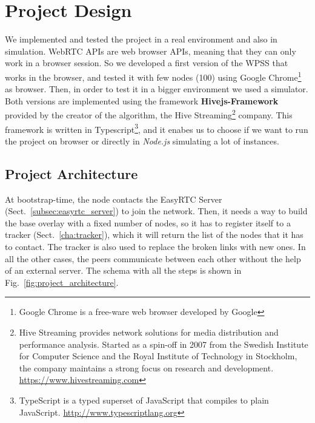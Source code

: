 \chapter{Project Design}
\label{cha:design}
We implemented and tested the project in a real environment and also in simulation. WebRTC APIs are web browser APIs, meaning that they can only work in a browser session. So we developed a first version of the \ac{WPSS} that works in the browser, and tested it with few nodes (100) using Google Chrome\footnote{Google Chrome is a free-ware web browser developed by Google} as browser. Then, in order to test it in a bigger environment we used a simulator. Both versions are implemented using the framework \textbf{Hivejs-Framework} provided by the creator of the algorithm, the Hive Streaming\footnote{Hive Streaming provides network solutions for media distribution and performance analysis. Started as a spin-off in 2007 from the Swedish Institute for Computer Science and the Royal Institute of Technology in Stockholm, the company maintains a strong focus on research and development. \url{https://www.hivestreaming.com}} company. This framework is written in Typescript\footnote{TypeScript is a typed superset of JavaScript that compiles to plain JavaScript. \url{http://www.typescriptlang.org}}, and it enabes us to choose if we want to run the project on browser or directly in \textit{Node.js} simulating a lot of instances. 


\section{Project Architecture}
\label{sec:arch}
At bootstrap-time, the node contacts the EasyRTC Server (Sect.~\ref{subsec:easyrtc_server}) to join the network. Then, it needs a way to build the base overlay with a fixed number of nodes, so it has to register itself to a tracker (Sect.~\ref{cha:tracker}), which it will return the list of the nodes that it has to contact. The tracker is also used to replace the broken links with new ones. In all the other cases, the peers communicate between each other without the help of an external server. The schema with all the steps is shown in Fig.~\ref{fig:project_architecture}.

